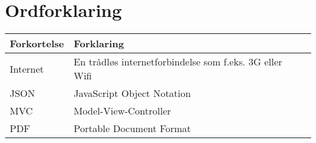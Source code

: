 \chapter*{Ordforklaring}

\begin{tabularx}{\textwidth}{l l X} \hline
	\textbf{Forkortelse}  & \textbf{Forklaring} \\ \hline
	Internet&  En trådløs internetforbindelse som f.eks. 3G eller Wifi& \\
	JSON& JavaScript Object Notation& \\
	MVC& Model-View-Controller& \\
	PDF& Portable Document Format& \\ 
	
\end{tabularx}